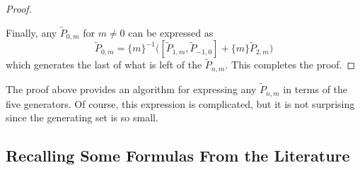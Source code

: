 \begin{proof}
\begin{center}
\end{center}

Finally, any $\widetilde{P}_{0,m}$ for $m \neq 0$ can be expressed as
\[
    \widetilde{P}_{0,m} = \{ m \}^{-1} \Big( [\widetilde{P}_{1,m}, \widetilde{P}_{-1,0}] + \{ m \} \widetilde{P}_{2,m} \Big)
\]
which generates the last of what is left of the $\widetilde{P}_{n,m}$. This completes the proof.
\end{proof}

\begin{remark}
The proof above provides an algorithm for expressing any $\widetilde{P}_{n,m}$ in terms of the five generators. Of course, this expression is complicated, but it is not surprising since the generating set is so small.
\end{remark}






\subsection{Recalling Some Formulas From the Literature}

